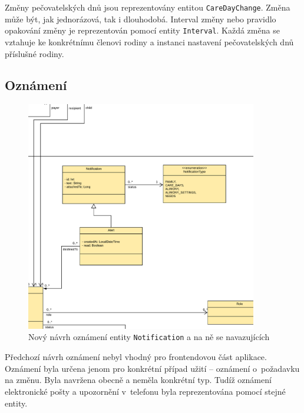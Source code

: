         Změny pečovatelských dnů jsou reprezentovány entitou \verb|CareDayChange|. Změna může být, jak jednorázová, tak i dlouhodobá. Interval změny nebo pravidlo opakování změny je reprezentován pomocí entity \verb|Interval|. Každá změna se vztahuje ke konkrétnímu členovi rodiny a instanci nastavení pečovatelských dnů příslušné rodiny.
        
    \subsection{Oznámení}\label{navrh:upravy:notification}
        \begin{figure}\centering
	       \includegraphics[width=0.9\textwidth]{pdfs/Notification2}
	       \caption[Nový návrh oznámení]{Nový návrh oznámení entity \texttt{Notification} a na ně se navazujících}\label{image:notification2}
        \end{figure}
        Předchozí návrh oznámení nebyl vhodný pro frontendovou část aplikace. Oznámení byla určena jenom pro konkrétní případ užití -- oznámení o~požadavku na změnu. Byla navržena obecně a neměla konkrétní typ. Tudíž oznámení elektronické pošty a upozornění v~telefonu byla reprezentována pomocí stejné entity.
        
